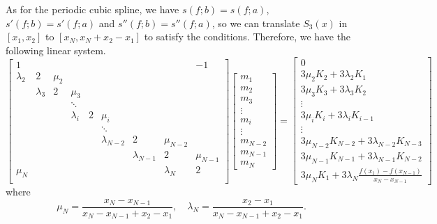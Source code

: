 \documentclass[a4paper]{article}
\theoremstyle{definition}
\begin{document}
As for the periodic cubic spline, we have $s(f; b) = s(f; a)$, $s'(f; b) = s'(f; a)$ and $s''(f; b) = s''(f; a)$, so we can translate $S_3(x)$ in $[x_1, x_2]$ to $[x_N, x_N + x_2 - x_1]$ to satisfy the conditions. Therefore, we have the following linear system.
\begin{equation}
  \begin{bmatrix}
    1 &  &  &  &  &  &  &  & -1 \\
    \lambda_2 & 2 & \mu_2 &  &  &  &  &  & \\
    & \lambda_3 & 2 & \mu_3 &  &  &  &  & \\
    &   &   & \ddots &  &  &  &  & \\
    &   &   & \lambda_i & 2 & \mu_i &  &  & \\
    &   &   &   &   & \ddots &  &  & \\
    &   &   &   &   & \lambda_{N - 2} & 2 & \mu_{N - 2} & \\
    &   &   &   &   &   & \lambda_{N - 1} & 2 & \mu_{N - 1} \\
    \mu_N &   &   &   &   &   &   & \lambda_N & 2 \\
  \end{bmatrix}
  \begin{bmatrix}
    m_1 \\ m_2 \\ m_3 \\ \vdots \\ m_i \\ \vdots \\ m_{N - 2} \\ m_{N - 1} \\ m_N
  \end{bmatrix}
  = \begin{bmatrix}
    0 \\
    3\mu_2 K_2 + 3\lambda_2 K_1 \\
    3\mu_3 K_3 + 3\lambda_3 K_2 \\
    \vdots \\
    3\mu_i K_i + 3\lambda_i K_{i - 1} \\
    \vdots \\
    3\mu_{N - 2} K_{N - 2} + 3\lambda_{N - 2} K_{N - 3} \\
    3\mu_{N - 1} K_{N - 1} + 3\lambda_{N - 1} K_{N - 2} \\
    3\mu_N K_1 + 3\lambda_N \frac{f(x_1) - f(x_{N - 1})}{x_N - x_{N - 1}}
    \end{bmatrix}
  \label{eq:pp-form-spline-linear-system-periodic}
\end{equation}
where 
\begin{equation}
    \mu_N = \frac{x_N - x_{N - 1}}{x_N - x_{N - 1} + x_2 - x_1},\quad \lambda_N = \frac{x_2 - x_1}{x_N - x_{N - 1} + x_2 - x_1}.
  \label{eq:pp-form-spline-linear-system-periodic-b}
\end{equation}
\end{document}
